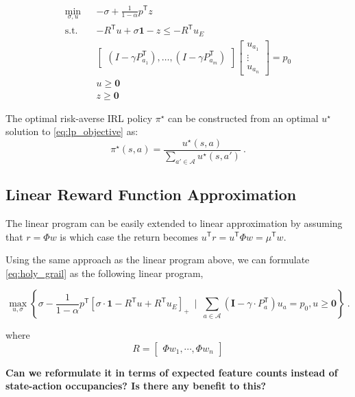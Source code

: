 \documentclass{article}
\newcommand{\tr}{^\mathsf{T}}
\newcommand{\one}{\mathbf{1}}
\newcommand{\zero}{\mathbf{0}}
\newcommand{\eye}{\mathbf{I}}
\newcommand{\opt}{^{\star}}
\begin{document}
\begin{eqnarray}
\min_{\sigma, u}&& -\sigma + \frac{1}{1-\alpha}p\tr z \\
\text{s.t.}&& - R\tr u + \sigma \one  - z  \leq -R\tr u_E\\
&&\begin{bmatrix}
(I - \gamma P_{a_1}\tr), \ldots, (I - \gamma P_{a_m}\tr)
\end{bmatrix}
\begin{bmatrix}
u_{a_1} \\
\vdots\\
u_{a_n}
\end{bmatrix}
= p_0 \\
&& u \geq \zero \\
&& z \geq \zero 
\end{eqnarray}	
	
	
	The optimal risk-averse IRL policy $\pi\opt$ can be constructed from an optimal $u\opt$ solution to \eqref{eq:lp_objective} as:
	\begin{equation} \label{eq:policy_from_u}
	\pi\opt(s,a) = \frac{u\opt(s,a)}{\sum_{a'\in\mathcal{A}} u\opt(s,a') }~. 
	\end{equation}
	

\subsection{Linear Reward Function Approximation}
	
	The linear program can be easily extended to linear approximation by assuming that $r = \Phi w$ is which case the return becomes $u\tr r = u\tr \Phi w = \mu\tr w$.
	
	
	Using the same approach as the linear program above, we can formulate \eqref{eq:holy_grail} as the following linear program,	
	
	\begin{equation} \label{eq:lp_objective}
	\max_{u,\sigma} \left\{ \sigma -\frac{1}{1-\alpha} p\tr \left[\sigma\cdot\one - R\tr u  + R\tr u_E \right]_+  ~\mid~ \sum_{a\in\mathcal{A}} (\eye - \gamma\cdot P_a\tr) u_a = p_0, u \ge \zero \right\}~.  
	\end{equation}
	
where 
\begin{equation}
R =
\begin{bmatrix}
\Phi w_1, \cdots, \Phi w_n 
\end{bmatrix}
\end{equation}

\textbf{Can we reformulate it in terms of expected feature counts instead of state-action occupancies? Is there any benefit to this?}
\end{document}
